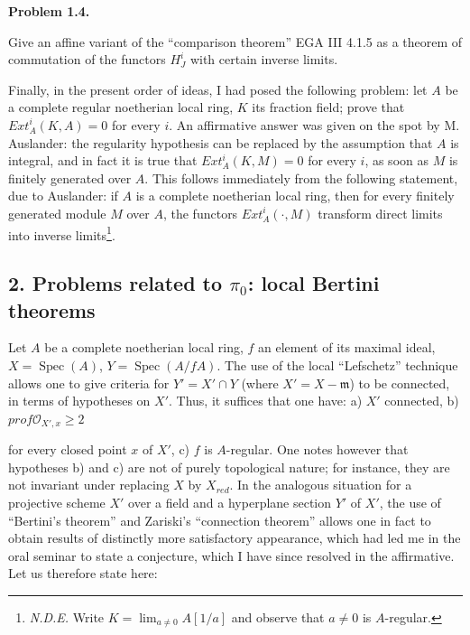 \documentclass[
]{article}
\begin{document}
\textbf{Problem 1.4.}

Give an affine variant of the ``comparison theorem'' EGA III 4.1.5 as a
theorem of commutation of the functors \(H^{i}_{J}\) with certain
inverse limits.

Finally, in the present order of ideas, I had posed the following
problem: let \(A\) be a complete regular noetherian local ring, \(K\)
its fraction field; prove that \(Ext^{i}_{A}(K, A) = 0\) for every
\(i\). An affirmative answer was given on the spot by M. Auslander: the
regularity hypothesis can be replaced by the assumption that \(A\) is
integral, and in fact it is true that \(Ext^{i}_{A}(K, M) = 0\) for
every \(i\), as soon as \(M\) is finitely generated over \(A\). This
follows immediately from the following statement, due to Auslander: if
\(A\) is a complete noetherian local ring, then for every finitely
generated module \(M\) over \(A\), the functors
\(Ext^{i}_{A}(\cdot, M)\) transform direct limits into inverse
limits\footnote{\emph{N.D.E.} Write \(K = \lim_{a \neq 0} A[1/a]\) and
  observe that \(a \neq 0\) is \(A\)-regular.}.

\subsection{\texorpdfstring{2. Problems related to \(\pi_{0}\): local
Bertini
theorems}{2. Problems related to \textbackslash pi\_\{0\}: local Bertini theorems}}\label{problems-related-to-pi_0-local-bertini-theorems}

Let \(A\) be a complete noetherian local ring, \(f\) an element of its
maximal ideal, \(X = \operatorname{Spec}(A)\),
\(Y = \operatorname{Spec}(A/fA)\). The use of the local ``Lefschetz''
technique allows one to give criteria for \(Y' = X' \cap Y\) (where
\(X' = X - {\mathfrak{m}}\)) to be connected, in terms of hypotheses on
\(X'\). Thus, it suffices that one have: a) \(X'\) connected, b)
\(prof \mathcal{O}_{X',x} \geqslant 2\)

for every closed point \(x\) of \(X'\), c) \(f\) is \(A\)-regular. One
notes however that hypotheses b) and c) are not of purely topological
nature; for instance, they are not invariant under replacing \(X\) by
\(X_{red}\). In the analogous situation for a projective scheme \(X'\)
over a field and a hyperplane section \(Y'\) of \(X'\), the use of
``Bertini's theorem'' and Zariski's ``connection theorem'' allows one in
fact to obtain results of distinctly more satisfactory appearance, which
had led me in the oral seminar to state a conjecture, which I have since
resolved in the affirmative. Let us therefore state here:
\end{document}
